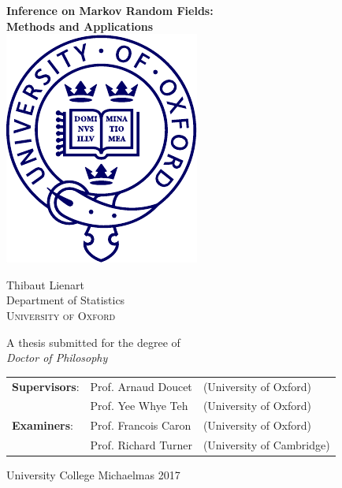 \begin{titlepage}
\begin{center}

\vspace*{1.2cm}

{\Huge{\bfseries Inference on Markov Random Fields:\\[.1cm] Methods and Applications}\\}
\vfill 
\vspace*{-.3cm}
\includegraphics[scale=.8]{figures/oxlogo}
\vspace*{-.9cm}
\vfill

{\Large Thibaut Lienart}\\[1.2cm]

{\large 
   	{Department of Statistics}}\\[0.3cm]
{\large 
   	{\textsc{University of Oxford}}}
	
\vspace*{-.4cm}
\vfill

{\large A thesis submitted for the degree of}\\[.3cm]

{\large \emph{Doctor of Philosophy}}\\[.3cm]
\end{center}
\vfill

\begin{flushright}
\begin{tabular}{l l l}
\textbf{Supervisors}: & Prof. Arnaud Doucet & (University of Oxford) \\
& Prof. Yee Whye Teh & (University of Oxford)\\[.2cm]
\textbf{Examiners}: & Prof. Francois Caron & (University of Oxford)\\
& Prof. Richard Turner &(University of Cambridge)
\end{tabular}
\end{flushright}


\vfill
{\large University College \hfill Michaelmas 2017}
\end{titlepage}